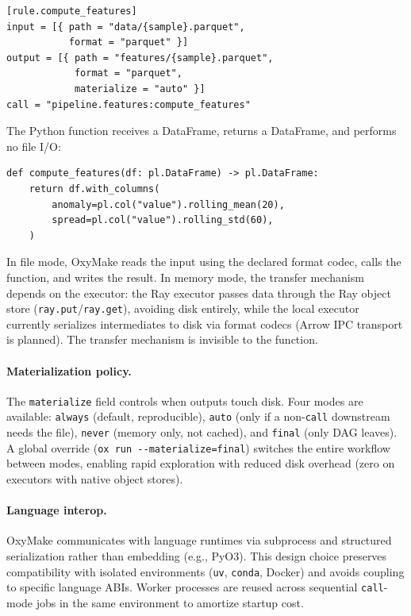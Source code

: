 \documentclass[12pt,a4paper]{article}
\newcommand{\code}[1]{{\texttt{\small\color{inlinecode}#1}}}
\begin{document}
\begin{lstlisting}[style=toml]
[rule.compute_features]
input = [{ path = "data/{sample}.parquet",
           format = "parquet" }]
output = [{ path = "features/{sample}.parquet",
            format = "parquet",
            materialize = "auto" }]
call = "pipeline.features:compute_features"
\end{lstlisting}

The Python function receives a DataFrame, returns a
DataFrame, and performs no file I/O:

\begin{lstlisting}[style=python]
def compute_features(df: pl.DataFrame) -> pl.DataFrame:
    return df.with_columns(
        anomaly=pl.col("value").rolling_mean(20),
        spread=pl.col("value").rolling_std(60),
    )
\end{lstlisting}

In file mode, OxyMake reads the input using the declared format codec,
calls the function, and writes the result. In memory mode, the transfer
mechanism depends on the executor: the Ray executor passes data through
the Ray object store (\code{ray.put}/\code{ray.get}), avoiding disk
entirely, while the local executor currently serializes intermediates
to disk via format codecs (Arrow IPC transport is planned).
The transfer mechanism is invisible to the function.

\paragraph{Materialization policy.}
The \code{materialize} field controls when outputs touch disk.
Four modes are available: \code{always} (default, reproducible),
\code{auto} (only if a non-\code{call} downstream needs the file),
\code{never} (memory only, not cached), and \code{final}
(only DAG leaves). A global override
(\code{ox\,run\,-{}-materialize=final}) switches the entire workflow
between modes, enabling rapid exploration with reduced disk overhead
(zero on executors with native object stores).

\paragraph{Language interop.}
OxyMake communicates with language runtimes via subprocess and
structured serialization rather than embedding (e.g., PyO3). This
design choice preserves compatibility with
isolated environments (\code{uv}, \code{conda}, Docker) and avoids
coupling to specific language ABIs. Worker processes are reused
across sequential \code{call}-mode jobs in the same environment to
amortize startup cost.
\end{document}
